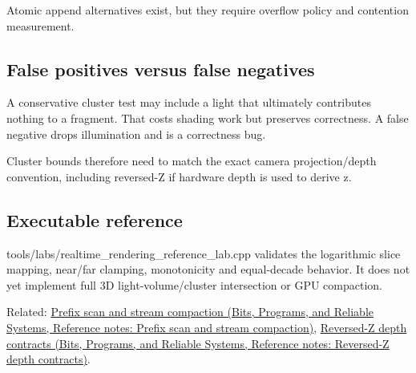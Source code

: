 Atomic append alternatives exist, but they require overflow policy and contention measurement.

\subsection{False positives versus false negatives}\label{appendix-b0efeb3f3648-false-positives-versus-false-negatives}

A conservative cluster test may include a light that ultimately contributes nothing to a fragment. That costs shading work but preserves correctness. A false negative drops illumination and is a correctness bug.

Cluster bounds therefore need to match the exact camera projection/depth convention, including reversed-Z if hardware depth is used to derive z.

\subsection{Executable reference}\label{appendix-b0efeb3f3648-executable-reference}

tools/labs/realtime\_rendering\_reference\_lab.cpp validates the logarithmic slice mapping, near/far clamping, monotonicity and equal-decade behavior. It does not yet implement full 3D light-volume/cluster intersection or GPU compaction.

Related: \href{../01-Bits-Programs-and-Reliable-Systems/main.pdf\#nameddest=appendix-f2ee4d086415}{Prefix scan and stream compaction (Bits, Programs, and Reliable Systems, Reference notes: Prefix scan and stream compaction)}, \href{../01-Bits-Programs-and-Reliable-Systems/main.pdf\#nameddest=appendix-275ec8847057}{Reversed-Z depth contracts (Bits, Programs, and Reliable Systems, Reference notes: Reversed-Z depth contracts)}.
